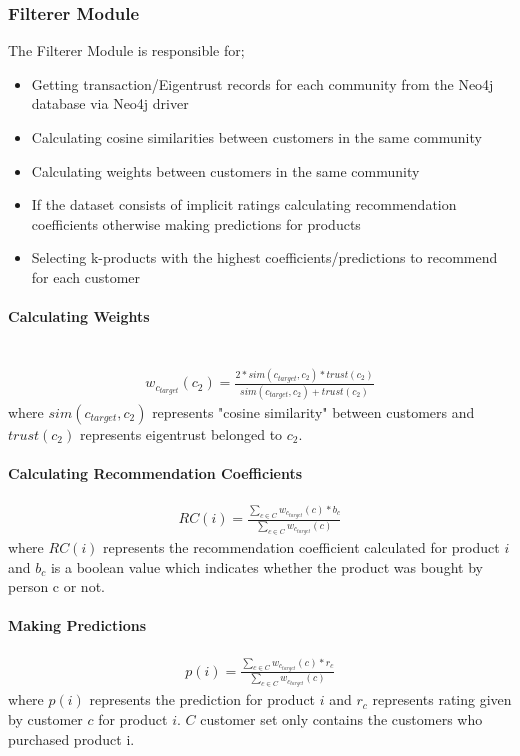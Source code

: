 	\subsubsection{Filterer Module} The Filterer Module is responsible for;
	\begin{itemize}
		\item Getting transaction/Eigentrust records for each community from the Neo4j database via Neo4j driver
		\item Calculating cosine similarities between customers in the same community
		\item Calculating weights between customers in the same community
		\item If the dataset consists of implicit ratings calculating recommendation coefficients otherwise making predictions for products
		\item Selecting k-products with the highest coefficients/predictions to recommend for each customer
	\end{itemize}

	\paragraph{Calculating Weights} \mbox{}\\
	\begin{equation*} 
	\begin{split}
	w_{c_{target}}(c_{2}) = \frac{2*sim(c_{target},c_{2})*trust(c_{2})}{sim(c_{target},c_{2})+trust(c_{2})}
	\end{split}
	\end{equation*}
	where $sim(c_{target},c_{2})$ represents "cosine similarity" between customers and $trust(c_{2})$ represents eigentrust belonged to $c_{2}$.

	\paragraph{Calculating Recommendation Coefficients}	
	\begin{equation*} 
	\begin{split}
	RC(i) = \frac{\sum_{c \in C}^{} w_{c_{target}}(c)*b_{c}}{\sum_{c \in C}^{} w_{c_{target}}(c)}
	\end{split}
	\end{equation*}
	where $RC(i)$ represents the recommendation coefficient calculated for product $i$ and $b_{c}$ is a boolean value which indicates whether the product was bought by person c or not.


	\paragraph{Making Predictions}
	\begin{equation*} 
	\begin{split}
	p(i) = \frac{\sum_{c \in C}^{} w_{c_{target}}(c)*r_{c}}{\sum_{c \in C}^{} w_{c_{target}}(c)}
	\end{split}
	\end{equation*}
	where $p(i)$ represents the prediction for product $i$ and $r_{c}$ represents rating given by customer $c$ for product $i$. $C$ customer set only contains the customers who purchased product i. \\
	
